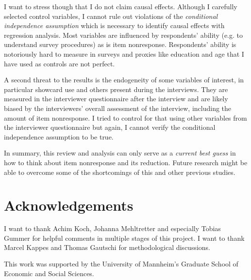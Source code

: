\documentclass[a4paper,12pt]{article}
\begin{document}
I want to stress though that I do not claim causal effects. Although I carefully selected control variables, I cannot rule out violations of the \textit{conditional independence assumption} which is necessary to identify causal effects with regression analysis. Most variables are influenced by respondents' ability (e.g. to understand survey procedures) as is item nonresponse. Respondents' ability is notoriously hard to measure in surveys and proxies like education and age that I have used as controls are not perfect.

A second threat to the results is the endogeneity of some variables of interest, in particular showcard use and others present during the interviews. They are measured in the interviewer questionnaire after the interview and are likely biased by the interviewers' overall assessment of the interview, including the amount of item nonresponse. I tried to control for that using other variables from the interviewer questionnaire but again, I cannot verify the conditional independence assumption to be true.

In summary, this review and analysis can only serve as a \textit{current best guess} in how to think about item nonresponse and its reduction. Future research might be able to overcome some of the shortcomings of this and other previous studies.

\section*{Acknowledgements}

I want to thank Achim Koch, Johanna Mehltretter and especially Tobias Gummer for helpful comments in multiple stages of this project. I want to thank Marcel Kappes and Thomas Gautschi for methodological discussions.

This work was supported by the University of Mannheim’s Graduate School of Economic and Social Sciences.

\singlespacing
\printbibliography

\newpage


\end{document}

